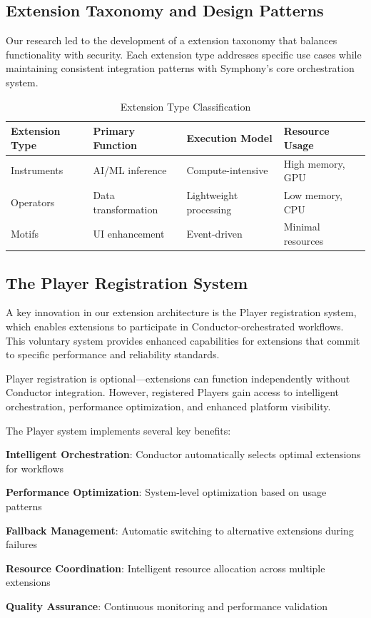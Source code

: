 \subsection*{Extension Taxonomy and Design Patterns}

Our research led to the development of a extension taxonomy that balances functionality with security. Each extension type addresses specific use cases while maintaining consistent integration patterns with Symphony's core orchestration system.

\begin{table}[ht]
\centering
\begin{tabular}{@{}llll@{}}
\toprule
\textbf{Extension Type} & \textbf{Primary Function} & \textbf{Execution Model} & \textbf{Resource Usage} \\
\midrule
Instruments & AI/ML inference & Compute-intensive & High memory, GPU \\
Operators & Data transformation & Lightweight processing & Low memory, CPU \\
Motifs & UI enhancement & Event-driven & Minimal resources \\
\bottomrule
\end{tabular}
\caption{Extension Type Classification}
\end{table}

\subsection*{The Player Registration System}

A key innovation in our extension architecture is the Player registration system, which enables extensions to participate in Conductor-orchestrated workflows. This voluntary system provides enhanced capabilities for extensions that commit to specific performance and reliability standards.

\begin{alertbox}
Player registration is optional—extensions can function independently without Conductor integration. However, registered Players gain access to intelligent orchestration, performance optimization, and enhanced platform visibility.
\end{alertbox}

The Player system implements several key benefits:

\begin{expandedlist}
    \item \textbf{Intelligent Orchestration}: Conductor automatically selects optimal extensions for workflows
    \item \textbf{Performance Optimization}: System-level optimization based on usage patterns
    \item \textbf{Fallback Management}: Automatic switching to alternative extensions during failures
    \item \textbf{Resource Coordination}: Intelligent resource allocation across multiple extensions
    \item \textbf{Quality Assurance}: Continuous monitoring and performance validation
\end{expandedlist}

